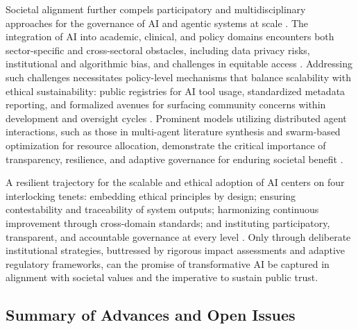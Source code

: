 \documentclass[11pt]{article}
\begin{document}
Societal alignment further compels participatory and multidisciplinary approaches for the governance of AI and agentic systems at scale \cite{1,3,7,10,13,15,22,23,24,25,26,27,29,31,34,35,42,43,44,45,46,47,48,49,50,51,52,53,54,55,56,57,60,64,65,76,78,80,86,87,88,89,90,91,92,93,94,95,96,97,98,100,101,102,103,104,105,106,109,110,111,112,113,114,115,117}. The integration of AI into academic, clinical, and policy domains encounters both sector-specific and cross-sectoral obstacles, including data privacy risks, institutional and algorithmic bias, and challenges in equitable access \cite{90,94,96,97,100,106}. Addressing such challenges necessitates policy-level mechanisms that balance scalability with ethical sustainability: public registries for AI tool usage, standardized metadata reporting, and formalized avenues for surfacing community concerns within development and oversight cycles \cite{95,106,110,113}. Prominent models utilizing distributed agent interactions, such as those in multi-agent literature synthesis and swarm-based optimization for resource allocation, demonstrate the critical importance of transparency, resilience, and adaptive governance for enduring societal benefit \cite{31,34,35,47,49,55}.

A resilient trajectory for the scalable and ethical adoption of AI centers on four interlocking tenets: embedding ethical principles by design; ensuring contestability and traceability of system outputs; harmonizing continuous improvement through cross-domain standards; and instituting participatory, transparent, and accountable governance at every level \cite{74,75,80,84,95,96,97,98,100,102,104,106,109,110}. Only through deliberate institutional strategies, buttressed by rigorous impact assessments and adaptive regulatory frameworks, can the promise of transformative AI be captured in alignment with societal values and the imperative to sustain public trust.

\subsection{Summary of Advances and Open Issues}
\end{document}
